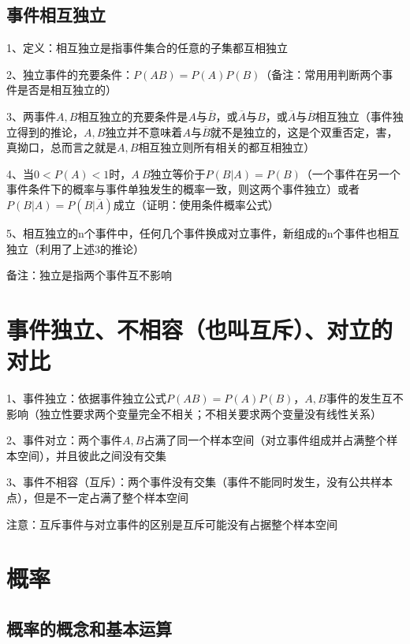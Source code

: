 \subsection{事件相互独立}

1、定义：相互独立是指事件集合的任意的子集都互相独立

2、独立事件的充要条件：$P(AB)=P(A)P(B)$（备注：常用用判断两个事件是否是相互独立的）

3、两事件$A,B$相互独立的充要条件是$A$与$\overline B$，或$\overline A$与$B$，或$\overline A$与$\overline B$相互独立（事件独立得到的推论，$A,B$独立并不意味着$A$与$\overline B$就不是独立的，这是个双重否定，害，真拗口，总而言之就是$A,B$相互独立则所有相关的都互相独立）

4、当$0<P(A)<1$时，$A \  B$独立等价于$P(B|A)=P(B)$（一个事件在另一个事件条件下的概率与事件单独发生的概率一致，则这两个事件独立）或者$P(B|A)=P(B|\overline A)$成立（证明：使用条件概率公式）

5、相互独立的n个事件中，任何几个事件换成对立事件，新组成的n个事件也相互独立（利用了上述3的推论）

备注：独立是指两个事件互不影响

\section{事件独立、不相容（也叫互斥）、对立的对比}

1、事件独立：依据事件独立公式$P(AB)=P(A)P(B)$，$A,B$事件的发生互不影响（独立性要求两个变量完全不相关；不相关要求两个变量没有线性关系）

2、事件对立：两个事件$A,B$占满了同一个样本空间（对立事件组成并占满整个样本空间），并且彼此之间没有交集

3、事件不相容（互斥）：两个事件没有交集（事件不能同时发生，没有公共样本点），但是不一定占满了整个样本空间

注意：互斥事件与对立事件的区别是互斥可能没有占据整个样本空间

\section{概率}



\subsection{概率的概念和基本运算}

